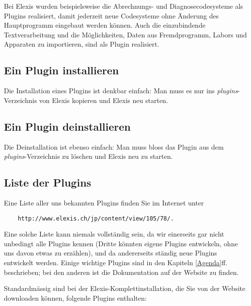 Bei Elexis wurden beispielsweise die Abrechnungs- und Diagnosecodesysteme als Plugins realisiert, damit jederzeit neue Codesysteme ohne Änderung des Hauptprogramm eingebaut werden können. Auch die einzubindende Textverarbeitung und die Möglichkeiten, Daten aus Fremdprogramm, Labors und Apparaten zu importieren, sind als Plugin realisiert.

\subsection{Ein Plugin installieren}
Die Installation eines Plugins ist denkbar einfach: Man muss es nur ins \textit{plugins}-Verzeichnis von Elexis kopieren und Elexis neu starten.

\subsection{Ein Plugin deinstallieren}
Die Deinstallation ist ebenso einfach: Man muss bloss das Plugin aus dem \textit{plugins}-Verzeichnis zu löschen und Elexis neu zu starten.

\subsection{Liste der Plugins}
Eine Liste aller uns bekannten Plugins finden Sie im Internet unter
\begin{verbatim}
    http://www.elexis.ch/jp/content/view/105/78/.
\end{verbatim}
Eine solche Liste kann niemals vollständig sein, da wir einerseits gar nicht unbedingt alle Plugins kennen (Dritte könnten eigene Plugins entwickeln, ohne uns davon etwas zu erzählen), und da andererseits ständig neue Plugins entwickelt werden. Einige wichtige Plugins sind in den Kapiteln \ref{Agenda}ff. beschrieben; bei den anderen ist die Dokumentation auf der Website zu finden.


\medskip

Standardmässig sind bei der Elexis-Komplettinstallation, die Sie von der Website downloaden können, folgende Plugins enthalten:

